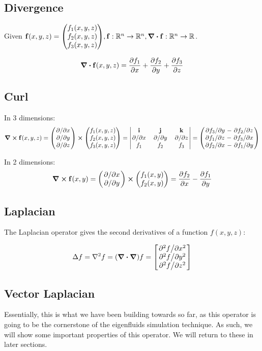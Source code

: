 \subsection*{Divergence}
Given $\vb{f}(x,y,z) = \mqty(f_1(x,y,z)\\f_2(x,y,z)\\f_3(x,y,z)), 
\vb{f}: \mathbb{R}^n \to \mathbb{R}^n, \div{\vb{f}}:
\mathbb{R}^n\to\mathbb{R}$.

$$\div{\vb{f}(x,y,z)} = \pdv{f_1}{x}+\pdv{f_2}{y}+\pdv{f_3}{z}$$

\subsection*{Curl}
In 3 dimensions:
$$\curl{\vb{f}(x,y,z) = 
    \mqty(\pdv*{x} \\ \pdv*{y} \\ \pdv*{z}) \cross 
    \mqty(f_1(x,y,z) \\ f_2(x,y,z) \\ f_3(x,y,z))
= \mqty|
    \vb{i}   & \vb{j}   & \vb{k}   \\
    \pdv*{x} & \pdv*{y} & \pdv*{z} \\
    f_1      & f_2      & f_3
|} = \mqty(
\pdv*{f_3}{y} - \pdv*{f_2}{z} \\
\pdv*{f_1}{z} - \pdv*{f_3}{x} \\
\pdv*{f_2}{x} - \pdv*{f_1}{y}
)$$

In 2 dimensions:
$$\curl{\vb{f}(x,y)} = 
    \mqty(\pdv*{x} \\ \pdv*{y}) \cross 
    \mqty(f_1(x,y) \\ f_2(x,y))
    = \pdv{f_2}{x} - \pdv{f_1}{y}$$

\subsection*{Laplacian}
The Laplacian operator gives the second derivatives of a function
$f(x,y,z)$:

$$\Delta f = \laplacian{f} = (\grad \vdot \grad)f 
= \mqty[\pdv*[2]{f}{x} \\ \pdv*[2]{f}{y} \\ \pdv*[2]{f}{z}]$$

\subsection*{Vector Laplacian}
Essentially, this is what we have been building towards so far, as this operator
is going to be the cornerstone of the eigenfluids simulation
technique. As such, we will show some important
properties of this operator. We will return to these in later
sections.


